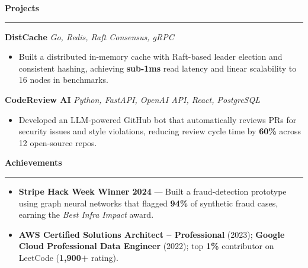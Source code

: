 \documentclass[10pt]{article}
\newlength{\sbw}\setlength{\sbw}{72mm}
\newcommand{\mainheading}[1]{%
  \vspace{4mm}%
  {\bfseries\large\color{accent} #1}\\[-1mm]%
  {\color{accent}\rule{\dimexpr\paperwidth-\sbw-14mm\relax}{0.6pt}}%
  \vspace{1mm}%
}
\newcommand{\projentry}[2]{%
  \vspace{1mm}%
  {\bfseries\color{maingray} #1} \textbar{} {\small\color{accent}\textit{#2}}%
  \vspace{0.5mm}%
}
\begin{document}
\begin{minipage}[t]{\dimexpr\paperwidth-\sbw\relax}
\begin{minipage}[t]{\dimexpr\paperwidth-\sbw-14mm\relax}
    \mainheading{Projects}

    \projentry{DistCache}{Go, Redis, Raft Consensus, gRPC}
    \begin{itemize}[leftmargin=*,itemsep=0pt,topsep=2pt,parsep=0pt]
      \small\color{maingray}
      \item Built a distributed in-memory cache with Raft-based leader election and consistent hashing, achieving \textbf{sub-1ms} read latency and linear scalability to 16 nodes in benchmarks.
    \end{itemize}

    \vspace{1mm}
    \projentry{CodeReview AI}{Python, FastAPI, OpenAI API, React, PostgreSQL}
    \begin{itemize}[leftmargin=*,itemsep=0pt,topsep=2pt,parsep=0pt]
      \small\color{maingray}
      \item Developed an LLM-powered GitHub bot that automatically reviews PRs for security issues and style violations, reducing review cycle time by \textbf{60\%} across 12 open-source repos.
    \end{itemize}

    \mainheading{Achievements}
    \begin{itemize}[leftmargin=*,itemsep=1pt,topsep=2pt,parsep=0pt]
      \small\color{maingray}
      \item \textbf{Stripe Hack Week Winner 2024} --- Built a fraud-detection prototype using graph neural networks that flagged \textbf{94\%} of synthetic fraud cases, earning the \emph{Best Infra Impact} award.
      \item \textbf{AWS Certified Solutions Architect -- Professional} (2023); \textbf{Google Cloud Professional Data Engineer} (2022); top \textbf{1\%} contributor on LeetCode (\textbf{1,900+} rating).
    \end{itemize}

  \end{minipage}
\end{minipage}
\end{document}
